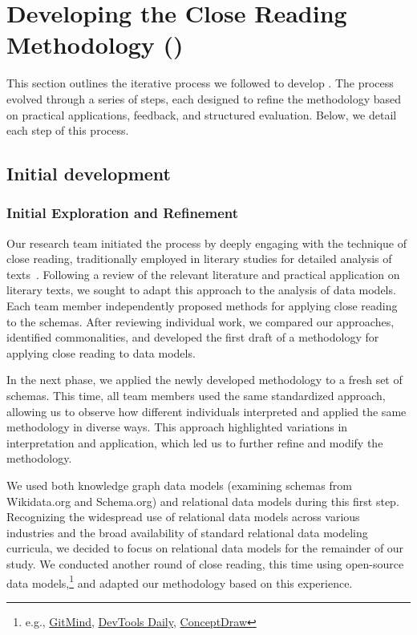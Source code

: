 \section{Developing the Close Reading Methodology (\credal)}
\label{sec:credal}

This section outlines the iterative process we followed to develop \credal. The process evolved through a series of steps, each designed to refine the methodology based on practical applications, feedback, and structured evaluation. Below, we detail each step of this process.

\subsection{Initial development}
\label{sec:credal:dev}

\subsubsection{Initial Exploration and Refinement}
\label{sec:credal:dev:1}

Our research team initiated the process by deeply engaging with the technique of close reading, traditionally employed in literary studies for detailed analysis of texts~\cite{frank}. Following a review of the relevant literature and practical application on literary texts, we sought to adapt this approach to the analysis of data models. Each team member independently proposed methods for applying close reading to the schemas. After reviewing individual work, we compared our approaches, identified commonalities, and developed the first draft of a methodology for applying close reading to data models.

In the next phase, we applied the newly developed methodology to a fresh set of schemas. This time, all team members used the same standardized approach, allowing us to observe how different individuals interpreted and applied the same methodology in diverse ways. This approach highlighted variations in interpretation and application, which led us to further refine and modify the methodology.

We used both knowledge graph data models (examining schemas from Wikidata.org and Schema.org) and relational data models during this first step. 
Recognizing the widespread use of relational data models \cite{silberschatz} across various industries and the broad availability of standard relational data modeling curricula, we decided to focus on relational data models for the remainder of our study.
We conducted another round of close reading, this time using open-source 
data models,\footnote{e.g., \href{https://gitmind.com/erd-examples.html}{GitMind}, \href{https://devtoolsdaily.medium.com/crafting-an-automatic-erd-generator-a-journey-from-ddl-to-diagram-83cc5da8cab7}{DevTools Daily}, \href{https://www.conceptdraw.com/How-To-Guide/entity-relationship-diagrams}{ConceptDraw}}
and adapted our methodology based on this experience.

